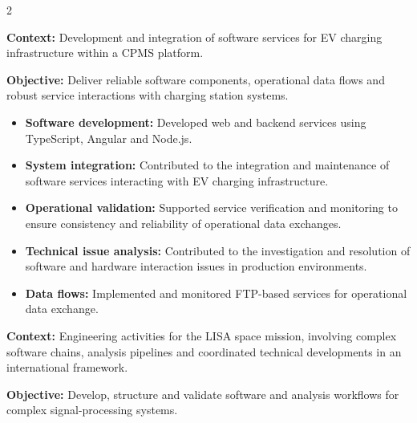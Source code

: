 \documentclass[8pt,a4paper,ragged2e,withhyper]{../_shared/altacv}
\begin{document}
\begin{paracol}{2}


\textbf{Context:} Development and integration of software services for EV charging infrastructure within a CPMS platform.

\textbf{Objective:} Deliver reliable software components, operational data flows and robust service interactions with charging station systems.

\begin{itemize}
\item \textbf{Software development:} Developed web and backend services using TypeScript, Angular and Node.js.
\item \textbf{System integration:} Contributed to the integration and maintenance of software services interacting with EV charging infrastructure.
\item \textbf{Operational validation:} Supported service verification and monitoring to ensure consistency and reliability of operational data exchanges.
\item \textbf{Technical issue analysis:} Contributed to the investigation and resolution of software and hardware interaction issues in production environments.
\item \textbf{Data flows:} Implemented and monitored FTP-based services for operational data exchange.
\end{itemize}

\divider


\textbf{Context:} Engineering activities for the LISA space mission, involving complex software chains, analysis pipelines and coordinated technical developments in an international framework.

\textbf{Objective:} Develop, structure and validate software and analysis workflows for complex signal-processing systems.


\end{paracol}
\end{document}

